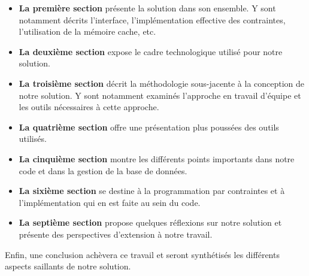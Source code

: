 \begin{itemize}
\item \textbf{La première section} présente la solution dans son ensemble. Y sont notamment décrits l'interface, l'implémentation effective des contraintes, l'utilisation de la mémoire cache, etc.\\

\item \textbf{La deuxième section} expose le cadre technologique utilisé pour notre solution.\\

\item \textbf{La troisième section} décrit la méthodologie sous-jacente à la conception de notre solution. Y sont notamment examinés l'approche en travail d'équipe et les outils nécessaires à cette approche.\\

\item \textbf{La quatrième section} offre une présentation plus poussées des outils utilisés.\\

\item \textbf{La cinquième section} montre les différents points importants dans notre code et dans la gestion de la base de données.\\

\item \textbf{La sixième section} se destine à la programmation par contraintes et à l'implémentation qui en est faite au sein du code.\\

\item \textbf{La septième section} propose quelques réflexions sur notre solution et présente des perspectives d'extension à notre travail.\\

\end{itemize}

Enfin, une conclusion achèvera ce travail et seront synthétisés les différents aspects saillants de notre solution.




